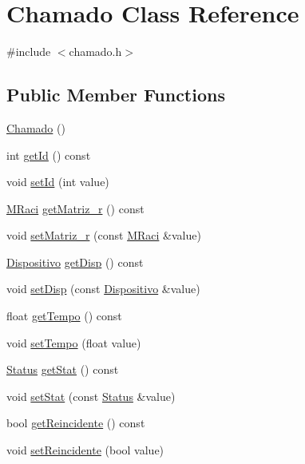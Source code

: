 \hypertarget{class_chamado}{}\section{Chamado Class Reference}
\label{class_chamado}


{\ttfamily \#include $<$chamado.\+h$>$}

\subsection*{Public Member Functions}
\begin{DoxyCompactItemize}
\item 
\hyperlink{class_chamado_aeca5f123901cef6b33104291dc3b2fc0}{Chamado} ()
\item 
int \hyperlink{class_chamado_af8c3890123d55faf3a9adc2a274daaf2}{get\+Id} () const
\item 
void \hyperlink{class_chamado_ad9d1c6ef5c44c56921711fa96ae27277}{set\+Id} (int value)
\item 
\hyperlink{class_m_raci}{M\+Raci} \hyperlink{class_chamado_a99eef2190042baefb398806d35372edd}{get\+Matriz\+\_\+r} () const
\item 
void \hyperlink{class_chamado_a5f8f04ee1b58b3bbb46f8ba6a9c22342}{set\+Matriz\+\_\+r} (const \hyperlink{class_m_raci}{M\+Raci} \&value)
\item 
\hyperlink{class_dispositivo}{Dispositivo} \hyperlink{class_chamado_a1388c89d1f5ae80b7cfac8106c48dbc9}{get\+Disp} () const
\item 
void \hyperlink{class_chamado_aedfd2171f66178c80462e0477b49a0f0}{set\+Disp} (const \hyperlink{class_dispositivo}{Dispositivo} \&value)
\item 
float \hyperlink{class_chamado_abbe9ba6e55ea448b02e9c091369c1d2a}{get\+Tempo} () const
\item 
void \hyperlink{class_chamado_a918eb6053797974911821b777695b0c2}{set\+Tempo} (float value)
\item 
\hyperlink{class_status}{Status} \hyperlink{class_chamado_aa3f9a0756cd55a435fcbec3419a328dc}{get\+Stat} () const
\item 
void \hyperlink{class_chamado_a8a695ce190dcd9acf05e8b7880579fec}{set\+Stat} (const \hyperlink{class_status}{Status} \&value)
\item 
bool \hyperlink{class_chamado_ad481bcca8ee859304d67728bff772b10}{get\+Reincidente} () const
\item 
void \hyperlink{class_chamado_a0abb993bda04f1bd32ed474abf06d0ad}{set\+Reincidente} (bool value)

\end{DoxyCompactItemize}
